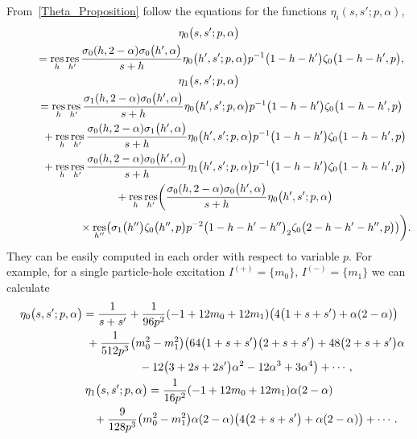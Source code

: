 \documentclass[pdftex]{sigma}
\numberwithin{equation}{section}
\DeclareMathOperator{\res}{res}
\begin{document}
From~\eqref{Theta_Proposition} follow the equations for the functions $\eta_i(s, s'; p, \alpha)$,
\begin{gather*}
 \eta_0\bigl(s, s'; p, \alpha\bigr)\\
\qquad{}=\res_h \res_{h'} \frac{\sigma_0(h, 2-\alpha) \sigma_0\bigl(h', \alpha\bigr)}{s+h} \eta_0\bigl(h', s'; p, \alpha\bigr) p^{-1} \bigl(1-h-h'\bigr) \zeta_0\bigl(1-h-h', p\bigr), \\
 \eta_1\bigl(s, s'; p, \alpha\bigr)\\
 \qquad{}=\res_h \res_{h'} \frac{\sigma_1(h, 2-\alpha) \sigma_0\bigl(h', \alpha\bigr)}{s+h} \eta_0\bigl(h', s'; p, \alpha\bigr) p^{-1} \bigl(1-h-h'\bigr) \zeta_0\bigl(1-h-h', p\bigr) \\
 \qquad\hphantom{=}{}+\res_h \res_{h'} \frac{\sigma_0(h, 2-\alpha) \sigma_1\bigl(h', \alpha\bigr)}{s+h} \eta_0\bigl(h', s'; p, \alpha\bigr) p^{-1} \bigl(1-h-h'\bigr) \zeta_0\bigl(1-h-h', p\bigr) \\
 \qquad\hphantom{=}{}+\res_h \res_{h'} \frac{\sigma_0(h, 2-\alpha) \sigma_0\bigl(h', \alpha\bigr)}{s+h} \eta_1\bigl(h', s'; p, \alpha\bigr) p^{-1} \bigl(1-h-h'\bigr) \zeta_0\bigl(1-h-h', p\bigr)\\
 \qquad\hphantom{=}{}+\res_h \res_{h'} \biggl(\frac{\sigma_0(h, 2-\alpha) \sigma_0\bigl(h', \alpha\bigr)}{s+h} \eta_0\bigl(h', s'; p, \alpha\bigr) \\
 \qquad\hphantom{=+\res_h \res_{h'} }{}\times\res_{h''} \bigl(\sigma_1\bigl(h''\bigr) \zeta_0\bigl(h'', p\bigr) p^{-2} \bigl(1-h-h'-h''\bigr)_2 \zeta_0\bigl(2-h-h'-h'', p\bigr) \bigr) \biggl).
\end{gather*}
They can be easily computed in each order with respect to variable $p$. For example, for a single particle-hole excitation $I^{(+)}=\{m_0\}$, $I^{(-)}=\{m_1\}$ we can calculate
\begin{gather*}
\eta_0\bigl(s, s'; p, \alpha\bigr) =\frac{1}{s+s'} + \frac{1}{96 p^2} (-1+12m_0+12m_1) \bigl(4\bigl(1+s+s')+\alpha(2-\alpha)\bigr) \\
\hphantom{\eta_0(s, s'; p, \alpha) =}{}
+\frac{1}{512p^3} \bigl(m_0^2-m_1^2\bigr) \bigl(64\bigl(1+s+s'\bigr)\bigl(2+s+s'\bigr)+48\bigl(2+s+s'\bigr)\alpha \cr
\hphantom{\eta_0(s, s'; p, \alpha) =}{}
-12\bigl(3+2s+2s'\bigr)\alpha^2-12\alpha^3+3\alpha^4\bigr)+\cdots ,\cr
\eta_1\bigl(s, s'; p, \alpha\bigr) =\frac{1}{16 p^2}(-1+12m_0+12m_1)\alpha(2-\alpha) \cr
\hphantom{\eta_1(s, s'; p, \alpha) =}{}                         +\frac{9}{128 p^3}\bigl(m_0^2-m_1^2\bigr)\alpha(2-\alpha)\bigl(4\bigl(2+s+s'\bigr)+\alpha(2-\alpha)\bigr)+\cdots . \nonumber
\end{gather*}
\end{document}
